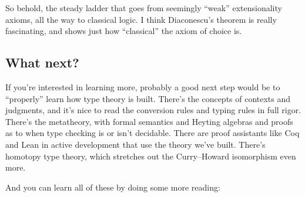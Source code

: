 \documentclass[11pt,paper=letter]{scrartcl}
\begin{document}
So behold, the steady ladder that goes from seemingly ``weak'' extensionality axioms, all the way to classical logic. I think Diaconescu's theorem is really fascinating, and shows just how ``classical'' the axiom of choice is.

\subsection{What next?}

If you're interested in learning more, probably a good next step would be to ``properly'' learn how type theory is built. There's the concepts of contexts and judgments, and it's nice to read the conversion rules and typing rules in full rigor. There's the metatheory, with formal semantics and Heyting algebras and proofs as to when type checking is or isn't decidable. There are proof assistants like Coq and Lean in active development that use the theory we've built. There's homotopy type theory, which stretches out the Curry--Howard isomorphism even more.

And you can learn all of these by doing some more reading:
\end{document}
